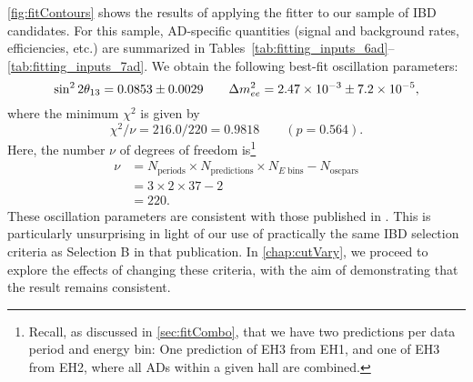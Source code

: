 \documentclass[../thesis.tex]{subfiles}
\begin{document}
\autoref{fig:fitContours} shows the results of applying the fitter to our sample of IBD candidates. For this sample, AD-specific quantities (signal and background rates, efficiencies, etc.) are summarized in Tables~\ref{tab:fitting_inputs_6ad}--\ref{tab:fitting_inputs_7ad}. We obtain the following best-fit oscillation parameters:
\begin{equation}
    \sin^2 2\theta_{13} = 0.0853 \pm 0.0029 \qquad \Delta m^2_{ee} = 2.47\times10^{-3} \pm 7.2\times10^{-5},
  \label{eq:fitResults}
\end{equation}
where the minimum $\chi^2$ is given by
\begin{equation}
  \chi^2 / \nu = 216.0 / 220 = 0.9818 \qquad (p = 0.564).
\end{equation}
Here, the number $\nu$ of degrees of freedom is\footnote{Recall, as discussed in \autoref{sec:fitCombo}, that we have two predictions per data period and energy bin: One prediction of EH3 from EH1, and one of EH3 from EH2, where all ADs within a given hall are combined.}
\begin{equation}
  \begin{aligned}
    \nu &= N_{\mathrm{periods}} \times N_{\mathrm{predictions}} \times N_{E\;\mathrm{bins}} - N_{\mathrm{osc pars}} \\
    &= 3 \times 2 \times 37 - 2 \\
    &= 220.
  \end{aligned}
\end{equation}
These oscillation parameters are consistent with those published in \cite{An_2017}. This is particularly unsurprising in light of our use of practically the same IBD selection criteria as Selection B in that publication. In \autoref{chap:cutVary}, we proceed to explore the effects of changing these criteria, with the aim of demonstrating that the result remains consistent.

\end{document}
